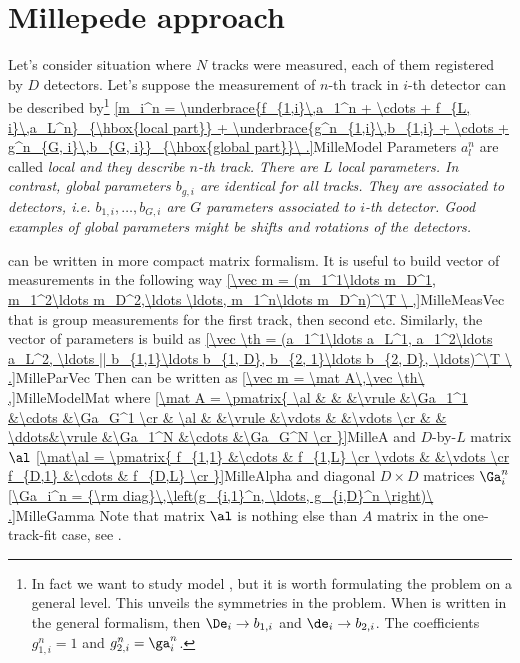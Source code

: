\section{Millepede approach}

Let's consider situation where $N$ tracks were measured, each of them registered by $D$ detectors. Let's suppose the measurement of $n$-th track in $i$-th detector can be described by\footnote{%
In fact we want to study model , but it is worth formulating the problem on a general level. This unveils the symmetries in the problem. When  is written in the general formalism, then $\De_i\to b_{1,i}$ and $\de_i\to b_{2,i}$. The coefficients $g_{1,i}^n=1$ and $g_{2,i}^n = \ga_i^n$.
}
\eqref{m_i^n = \underbrace{f_{1,i}\,a_1^n + \cdots + f_{L, i}\,a_L^n}_{\hbox{local part}} + 
\underbrace{g^n_{1,i}\,b_{1,i} + \cdots + g^n_{G, i}\,b_{G, i}}_{\hbox{global part}}\ .}{MilleModel}
Parameters $a_l^n$ are called \em{local} and they describe $n$-th track. There are $L$ local parameters. In contrast, \em{global} parameters $b_{g, i}$ are identical for all tracks. They are associated to detectors, i.e. $b_{1, i},\ldots,b_{G, i}$ are $G$ parameters associated to $i$-th detector. Good examples of global parameters might be shifts and rotations of the detectors.

 can be written in more compact matrix formalism. It is useful to build vector of measurements in the following way
\eqref{\vec m = (m_1^1\ldots m_D^1, m_1^2\ldots m_D^2,\ldots \ldots, m_1^n\ldots m_D^n)^\T \ ,}{MilleMeasVec}
that is group measurements for the first track, then second etc. Similarly, the vector of parameters is build as
\eqref{\vec \th = (a_1^1\ldots a_L^1, a_1^2\ldots a_L^2, \ldots || b_{1,1}\ldots b_{1, D}, b_{2, 1}\ldots b_{2, D}, \ldots)^\T \ .}{MilleParVec}
Then  can be written as
\eqref{\vec m = \mat A\,\vec \th\ ,}{MilleModelMat}
where
\eqref{\mat A = \pmatrix{
\al & 		&		&\vrule	&\Ga_1^1	&\cdots	&\Ga_G^1	\cr
	& \al	&		&\vrule	&\vdots		&		&\vdots		\cr
	&		& \ddots&\vrule	&\Ga_1^N	&\cdots	&\Ga_G^N	\cr
}}{MilleA}
and $D$-by-$L$ matrix $\al$
\eqref{\mat\al = \pmatrix{
f_{1,1}	&\cdots	& f_{1,L}	\cr
\vdots	&		&\vdots		\cr
f_{D,1}	&\cdots	& f_{D,L}	\cr
}}{MilleAlpha}
and diagonal $D\times D$ matrices $\Ga_i^n$
\eqref{\Ga_i^n = {\rm diag}\,\left(g_{i,1}^n, \ldots, g_{i,D}^n \right)\ .}{MilleGamma}
Note that matrix $\al$ is nothing else than $A$ matrix in the one-track-fit case, see .

